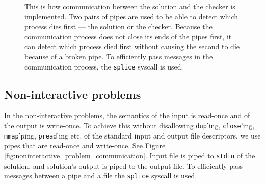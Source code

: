 \documentclass[en]{pracamgr}
\begin{document}
\begin{figure}[h]
\tikzset{>=latex} %
\centering
{}
\caption{This is how communication between the solution and the checker is implemented. Two pairs of pipes are used to be able to detect which process dies first --- the solution or the checker. Because the communication process does not close its ends of the pipes first, it can detect which process died first without causing the second to die because of a broken pipe. To efficiently pass messages in the communication process, the \texttt{splice} syscall is used.}
\label{fig:interactive_problem_real_communication}
\end{figure}

\subsection{Non-interactive problems}

In the non-interactive problems, the semantics of the input is read-once and of the output is write-once. To achieve this without disallowing \texttt{dup}'ing, \texttt{close}'ing, \texttt{mmap}'ping, \texttt{pread}'ing etc. of the standard input and output file descriptors, we use pipes that are read-once and write-once. See Figure \ref{fig:noninteractive_problem_communication}. Input file is piped to \texttt{stdin} of the solution, and solution's output is piped to the output file. To efficiently pass messages between a pipe and a file the \texttt{splice} syscall is used.
\end{document}
